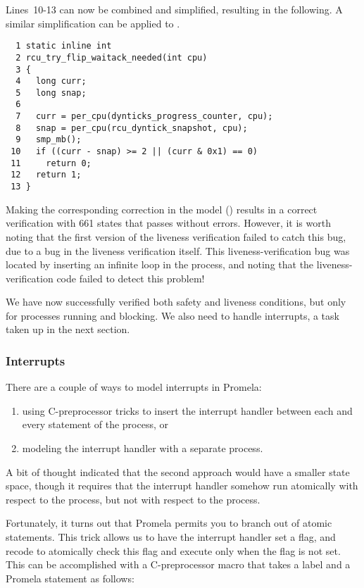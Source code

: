 Lines~10-13 can now be combined and simplified,
resulting in the following.
A similar simplification can be applied to
.

{ \scriptsize
\begin{verbatim}
  1 static inline int
  2 rcu_try_flip_waitack_needed(int cpu)
  3 {
  4   long curr;
  5   long snap;
  6
  7   curr = per_cpu(dynticks_progress_counter, cpu);
  8   snap = per_cpu(rcu_dyntick_snapshot, cpu);
  9   smp_mb();
 10   if ((curr - snap) >= 2 || (curr & 0x1) == 0)
 11     return 0;
 12   return 1;
 13 }
\end{verbatim}
}

Making the corresponding correction in the
model ()
results in a correct verification with 661 states that passes without
errors.
However, it is worth noting that the first version of the liveness
verification failed to catch this bug, due to a bug in the liveness
verification itself.
This liveness-verification bug was located by inserting an infinite
loop in the  process, and noting that
the liveness-verification code failed to detect this problem!

We have now successfully verified both safety and liveness
conditions, but only for processes running and blocking.
We also need to handle interrupts, a task taken up in the next section.

\subsubsection{Interrupts}
\label{sec:formal:Interrupts}

There are a couple of ways to model interrupts in Promela:
\begin{enumerate}
\item	using C-preprocessor tricks to insert the interrupt handler
	between each and every statement of the 
	process, or
\item	modeling the interrupt handler with a separate process.
\end{enumerate}

A bit of thought indicated that the second approach would have a
smaller state space, though it requires that the interrupt handler
somehow run atomically with respect to the 
process, but not with respect to the 
process.

Fortunately, it turns out that Promela permits you to branch
out of atomic statements.
This trick allows us to have the interrupt handler set a flag, and
recode  to atomically check this flag
and execute only when the flag is not set.
This can be accomplished with a C-preprocessor macro that takes
a label and a Promela statement as follows:

